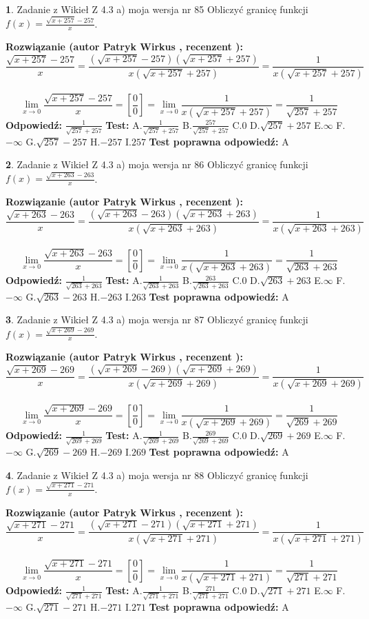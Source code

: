 \documentclass[12pt, a4paper]{article}
\theoremstyle{definition} %
\newtheorem{zad}{}
\newcommand{\zadStart}[1]{\begin{zad}#1\newline}
\newcommand{\zadStop}{\end{zad}}
\newcommand{\rozwStart}[2]{\noindent \textbf{Rozwiązanie (autor #1 , recenzent #2): }\newline}
\newcommand{\rozwStop}{\newline}
\newcommand{\odpStart}{\noindent \textbf{Odpowiedź:}\newline}
\newcommand{\odpStop}{\newline}
\newcommand{\testStart}{\noindent \textbf{Test:}\newline}
\newcommand{\testStop}{\newline}
\newcommand{\kluczStart}{\noindent \textbf{Test poprawna odpowiedź:}\newline}
\newcommand{\kluczStop}{\newline}
\begin{document}
\zadStart{Zadanie z Wikieł Z 4.3 a) moja wersja nr 85}
Obliczyć granicę funkcji $f(x)=\frac{\sqrt{x+257}-257}{x}$.
\zadStop
\rozwStart{Patryk Wirkus}{}
$$\frac{\sqrt{x+257}-257}{x}=\frac{(\sqrt{x+257}-257)(\sqrt{x+257}+257)}{x(\sqrt{x+257}+257)}=\frac{1}{x(\sqrt{x+257}+257)}$$
\\
$$\lim\limits_{x\to0}\frac{\sqrt{x+257}-257}{x}=[\frac{0}{0}]=
\lim\limits_{x\to0}\frac{1}{x(\sqrt{x+257}+257)} = \frac{1}{\sqrt{257}+257}$$
\rozwStop
\odpStart
$\frac{1}{\sqrt{257}+257}$
\odpStop
\testStart
A.$\frac{1}{\sqrt{257}+257}$
B.$\frac{257}{\sqrt{257}+257}$
C.$0$
D.$\sqrt{257}+257$
E.$\infty$
F.$-\infty$
G.$\sqrt{257}-257$
H.$-257$
I.$257$
\testStop
\kluczStart
A
\kluczStop



\zadStart{Zadanie z Wikieł Z 4.3 a) moja wersja nr 86}
Obliczyć granicę funkcji $f(x)=\frac{\sqrt{x+263}-263}{x}$.
\zadStop
\rozwStart{Patryk Wirkus}{}
$$\frac{\sqrt{x+263}-263}{x}=\frac{(\sqrt{x+263}-263)(\sqrt{x+263}+263)}{x(\sqrt{x+263}+263)}=\frac{1}{x(\sqrt{x+263}+263)}$$
\\
$$\lim\limits_{x\to0}\frac{\sqrt{x+263}-263}{x}=[\frac{0}{0}]=
\lim\limits_{x\to0}\frac{1}{x(\sqrt{x+263}+263)} = \frac{1}{\sqrt{263}+263}$$
\rozwStop
\odpStart
$\frac{1}{\sqrt{263}+263}$
\odpStop
\testStart
A.$\frac{1}{\sqrt{263}+263}$
B.$\frac{263}{\sqrt{263}+263}$
C.$0$
D.$\sqrt{263}+263$
E.$\infty$
F.$-\infty$
G.$\sqrt{263}-263$
H.$-263$
I.$263$
\testStop
\kluczStart
A
\kluczStop



\zadStart{Zadanie z Wikieł Z 4.3 a) moja wersja nr 87}
Obliczyć granicę funkcji $f(x)=\frac{\sqrt{x+269}-269}{x}$.
\zadStop
\rozwStart{Patryk Wirkus}{}
$$\frac{\sqrt{x+269}-269}{x}=\frac{(\sqrt{x+269}-269)(\sqrt{x+269}+269)}{x(\sqrt{x+269}+269)}=\frac{1}{x(\sqrt{x+269}+269)}$$
\\
$$\lim\limits_{x\to0}\frac{\sqrt{x+269}-269}{x}=[\frac{0}{0}]=
\lim\limits_{x\to0}\frac{1}{x(\sqrt{x+269}+269)} = \frac{1}{\sqrt{269}+269}$$
\rozwStop
\odpStart
$\frac{1}{\sqrt{269}+269}$
\odpStop
\testStart
A.$\frac{1}{\sqrt{269}+269}$
B.$\frac{269}{\sqrt{269}+269}$
C.$0$
D.$\sqrt{269}+269$
E.$\infty$
F.$-\infty$
G.$\sqrt{269}-269$
H.$-269$
I.$269$
\testStop
\kluczStart
A
\kluczStop



\zadStart{Zadanie z Wikieł Z 4.3 a) moja wersja nr 88}
Obliczyć granicę funkcji $f(x)=\frac{\sqrt{x+271}-271}{x}$.
\zadStop
\rozwStart{Patryk Wirkus}{}
$$\frac{\sqrt{x+271}-271}{x}=\frac{(\sqrt{x+271}-271)(\sqrt{x+271}+271)}{x(\sqrt{x+271}+271)}=\frac{1}{x(\sqrt{x+271}+271)}$$
\\
$$\lim\limits_{x\to0}\frac{\sqrt{x+271}-271}{x}=[\frac{0}{0}]=
\lim\limits_{x\to0}\frac{1}{x(\sqrt{x+271}+271)} = \frac{1}{\sqrt{271}+271}$$
\rozwStop
\odpStart
$\frac{1}{\sqrt{271}+271}$
\odpStop
\testStart
A.$\frac{1}{\sqrt{271}+271}$
B.$\frac{271}{\sqrt{271}+271}$
C.$0$
D.$\sqrt{271}+271$
E.$\infty$
F.$-\infty$
G.$\sqrt{271}-271$
H.$-271$
I.$271$
\testStop
\kluczStart
A
\kluczStop
\end{document}
